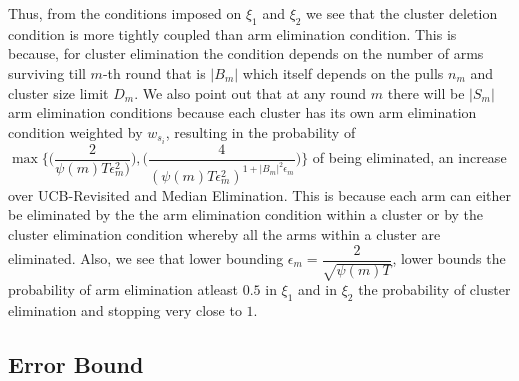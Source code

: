\begin{remark}
	Thus, from the conditions imposed on $\xi_{1}$ and $\xi_{2}$ we see that the cluster deletion condition is more tightly coupled than arm elimination condition. This is because, for cluster elimination the condition depends on the number of arms surviving till $m$-th round that is $|B_{m}|$ which itself depends on the pulls $n_{m}$ and cluster size limit $D_{m}$. We also point out that at any round $m$ there will be $|S_{m}|$ arm elimination conditions because each cluster has its own arm elimination condition weighted by $w_{s_{i}}$, resulting in the probability of $\max{\bigg\lbrace \bigg(\dfrac{2}{\psi(m)T\epsilon_{m}^{2})}\bigg) ,\bigg(\dfrac{4}{(\psi(m)T\epsilon_{m}^{2})^{1+|B_{m}|^{2}\epsilon_{m}}}\bigg)\bigg\rbrace}$ of being eliminated, an increase over UCB-Revisited and Median Elimination. This is because each arm can either be eliminated by the the arm elimination condition within a cluster or by the cluster elimination condition whereby all the arms within a cluster are eliminated. Also, we 
see that lower bounding $\epsilon_{m}=\dfrac{2}{\sqrt{\psi(m)T}}$, lower bounds the probability of arm elimination atleast $0.5$ in $\xi_{1}$ and in $\xi_{2}$ the probability of cluster elimination and stopping very close to $1$.
\end{remark}



\subsection{Error Bound}
	
